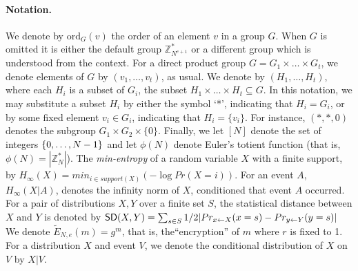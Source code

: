 \documentclass[11pt]{article}
\newcommand{\SD}{{\sf SD }}
\newcommand{\encdjnr}{{\tilde{E}}_{N,e}}
\newcommand{\U}[1]{\mathbb{Z}_{#1}^*}
\newcommand{\mathify}[1]{\ifmmode{#1}\else\mbox{$#1$}\fi}
\newcommand{\set}[2][]{\mathify{{\left\{#2\right\}}^{#1}}}
\newcommand{\opbrange}[3][,]{#2#1\ldots#1#3}
\newcommand{\order}{{\mathrm{ord}}}
\begin{document}
\paragraph{Notation.} We denote by $\order_G(v)$ the order of an
element $v$ in a group $G$. When $G$ is omitted it is either the
default group $\U{N^{e+1}}$ or a different group which is
understood from the context. For a direct product group
$G=\opbrange[\times]{G_1}{G_t}$, we denote elements of $G$ by
$(\opbrange{v_1}{v_t})$, as usual.
We denote by $(\opbrange{H_1}{H_t})$, where each
$H_i$ is a subset of $G_i$, the subset
$\opbrange[\times]{H_1}{H_t}\subseteq G$. In this notation, we may
substitute a subset $H_i$ by either the symbol `*', indicating that
$H_i=G_i$, or by some fixed element $v_i\in G_i$, indicating that
$H_i=\{v_i\}$. For instance, $(*,*,0)$ denotes the subgroup
$G_1\times G_2\times \{0\}$. Finally, we let $[N]$ denote the set
of integers $\set{\opbrange{0}{N-1}}$ and let $\phi(N)$ denote
Euler's totient function (that is, $\phi(N)=|\U{N}|$). The \emph{min-entropy}
of a random variable $X$ with a finite support, by $H_\infty(X)=min_{i\in support(X)}(-\log{Pr(X=i)})$.
For an event $A$, $H_\infty(X|A)$, denotes the infinity norm of $X$, conditioned that event $A$ occurred. For a pair of distributions $X,Y$ over a finite set $S$, the statistical distance between $X$ and $Y$ is denoted by $\SD(X,Y) = \sum_{s\in S}1/2|Pr_{x\leftarrow X}(x = s) - Pr_{y\leftarrow Y}(y = s)|$
We denote $\encdjnr(m)=g^m$, that is, the``encryption'' of $m$ where $r$ is fixed to 1. For a distribution $X$ and event $V$, we denote the conditional distribution of $X$ on $V$ by $X|V$.
\end{document}
